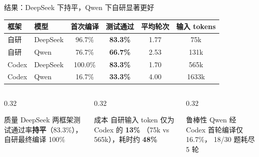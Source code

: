 \documentclass[10pt,aspectratio=169]{beamer}
\begin{document}
\begin{frame}{结果：DeepSeek 下持平，Qwen 下自研显著更好}
	\vspace{0.6em}
	\begin{center}
		\large
		\setlength{\tabcolsep}{7pt}
		\renewcommand{\arraystretch}{1.35}
		\begin{tabular}{llcccc}
			\hline
			框架 & 模型 & 首次编译 & 测试通过 & 平均轮次 & 输入 tokens \\
			\hline
			自研 & DeepSeek & 96.7\% & \textbf{83.3\%} & 1.77 & 75k \\
			自研 & Qwen     & 76.7\% & \textbf{66.7\%} & 2.53 & 131k \\
			Codex & DeepSeek & 100.0\% & \textbf{83.3\%} & 1.70 & 565k \\
			\rowcolor{red!12}
			Codex & Qwen     & 16.7\% & \textbf{33.3\%} & 4.00 & 1633k \\
			\hline
		\end{tabular}
	\end{center}
	\vspace{0.4em}
	\begin{columns}[T]
		\begin{column}{0.32\textwidth}
			\begin{block}{质量}
				DeepSeek 两框架测试通过率\textbf{持平}（83.3\%），
				自研最终编译 100\%
			\end{block}
		\end{column}
		\begin{column}{0.32\textwidth}
			\begin{block}{成本}
				自研输入 token 仅为 Codex 的 \textbf{13\%}
				（75k vs 565k），耗时约 \textbf{48\%}
			\end{block}
		\end{column}
		\begin{column}{0.32\textwidth}
			\begin{block}{鲁棒性}
				Qwen 经 Codex 首轮编译仅 16.7\%，
				18/30 题耗尽 5 轮
			\end{block}
		\end{column}
	\end{columns}
\end{frame}
\end{document}
